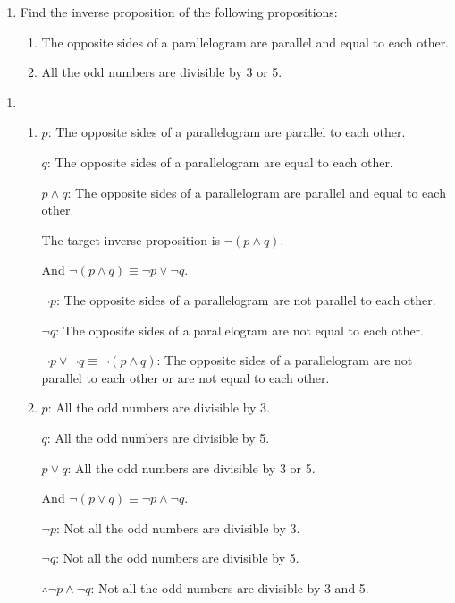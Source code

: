 \documentclass{report}
\begin{document}
\vspace{0.5cm}
\begin{enumerate}[label=\textbf{Example \arabic*}, leftmargin=*, start=12]
    \item Find the inverse proposition of the following propositions:
          \begin{enumerate}[label=(\alph*)]
              \item The opposite sides of a parallelogram are parallel and equal to each other.
              \item All the odd numbers are divisible by 3 or 5.
          \end{enumerate}
\end{enumerate}
\begin{enumerate}[label=\textbf{Sol.}, leftmargin=*]
    \item \begin{enumerate}[label=(\alph*)]
              \item $p$: The opposite sides of a parallelogram are parallel to each other.

                    $q$: The opposite sides of a parallelogram are equal to each other.

                    $p \land q$: The opposite sides of a parallelogram are parallel and equal to each other.

                    The target inverse proposition is $\neg(p \land q)$.

                    And $\neg(p \land q) \equiv \neg p \lor \neg q$.

                    $\neg p$: The opposite sides of a parallelogram are not parallel to each other.

                    $\neg q$: The opposite sides of a parallelogram are not equal to each other.

                    $\neg p \lor \neg q \equiv \neg(p \land q)$: The opposite sides of a parallelogram are not parallel to each other or are not equal to each other.

              \item $p$: All the odd numbers are divisible by 3.

                    $q$: All the odd numbers are divisible by 5.

                    $p \lor q$: All the odd numbers are divisible by 3 or 5.

                    And $\neg(p \lor q) \equiv \neg p \land \neg q$.

                    $\neg p$: Not all the odd numbers are divisible by 3.

                    $\neg q$: Not all the odd numbers are divisible by 5.

                    $\therefore \neg p \land \neg q$: Not all the odd numbers are divisible by 3 and 5.
          \end{enumerate}
\end{enumerate}
\end{document}
